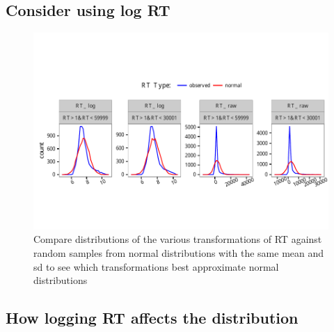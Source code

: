 \documentclass[a4paper,12pt,twoside]{article}\usepackage[]{graphicx}\usepackage[]{color}
\makeatletter
\def\maxwidth{ %
  \ifdim\Gin@nat@width>\linewidth
    \linewidth
  \else
    \Gin@nat@width
  \fi
}
\newenvironment{knitrout}{}{} %
\makeatother
\begin{document}
\clearpage
\subsection{Consider using log RT}



\begin{knitrout}\scriptsize
{}\color{fgcolor}\begin{figure}[hbtp]

{\centering \includegraphics[width=\maxwidth]{figure/graphics-plotDistFreqPolys-1} 

}

\caption[Compare distributions of the various transformations of RT against random samples from normal distributions with the same mean and sd to see which transformations best approximate normal distributions]{Compare distributions of the various transformations of RT against random samples from normal distributions with the same mean and sd to see which transformations best approximate normal distributions}\label{fig:plotDistFreqPolys}
\end{figure}


\end{knitrout}

\clearpage
\subsection{How logging RT affects the distribution}
\end{document}
